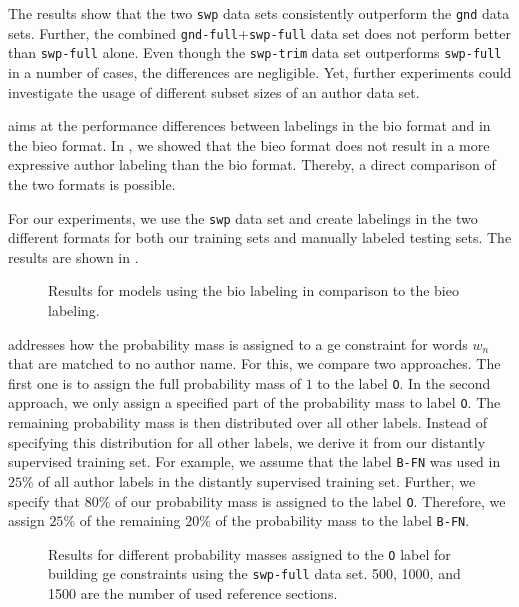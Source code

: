 The results show that the two \texttt{swp} data sets consistently outperform the \texttt{gnd} data sets.
Further, the combined \texttt{gnd-full}+\texttt{swp-full} data set does not perform better than \texttt{swp-full} alone.
Even though the \texttt{swp-trim} data set outperforms \texttt{swp-full} in a number of cases, the differences are negligible.
Yet, further experiments could investigate the usage of different subset sizes of an author data set.

\bigskip

 aims at the performance differences between labelings in the \gls{bio} format and in the \gls{bieo} format.
In , we showed that the \gls{bieo} format does not result in a more expressive author labeling than the \gls{bio} format.
Thereby, a direct comparison of the two formats is possible.

For our experiments, we use the \texttt{swp} data set and create labelings in the two different formats for both our training sets and manually labeled testing sets.
The results are shown in .
\begin{figure}[t]

\caption{Results for models using the \gls{bio} labeling in comparison to the \gls{bieo} labeling.}
\label{fig:eval-end-tags}
\end{figure}

\bigskip

 addresses how the probability mass is assigned to a \gls{ge} constraint for words $w_n$ that are matched to no author name.
For this, we compare two approaches.
The first one is to assign the full probability mass of $1$ to the label \texttt{O}.
In the second approach, we only assign a specified part of the probability mass to label \texttt{O}.
The remaining probability mass is then distributed over all other labels.
Instead of specifying this distribution for all other labels, we derive it from our distantly supervised training set.
For example, we assume that the label \texttt{B-FN} was used in $25\%$ of all author labels in the distantly supervised training set.
Further, we specify that $80\%$ of our probability mass is assigned to the label \texttt{O}.
Therefore, we assign $25\%$ of the remaining $20\%$ of the probability mass to the label \texttt{B-FN}.

\begin{figure}[t]

\caption{Results for different probability masses assigned to the \texttt{O} label for building \gls{ge} constraints using the \texttt{swp-full} data set. 500, 1000, and 1500 are the number of used reference sections.}
\label{fig:eval-other-percentages}
\end{figure}

